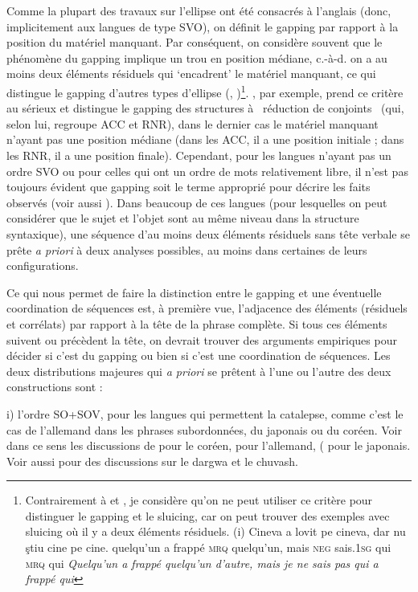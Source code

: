 Comme la plupart des travaux sur l'ellipse ont été consacrés à l'anglais (donc, implicitement aux langues de type SVO), on définit le gapping par rapport à la position du matériel manquant. Par conséquent, on considère souvent que le phénomène du gapping implique un trou en position médiane, c.-à-d. on a au moins deux éléments résiduels qui `encadrent' le matériel manquant, ce qui distingue le gapping d'autres types d'ellipse (\citet{Jackendoff1971}, \citet{Lobeck1995})\footnote{Contrairement à \citet{Jackendoff1971} et \citet{Lobeck1995}, je considère qu'on ne peut utiliser ce critère pour distinguer le gapping et le sluicing, car on peut trouver des exemples avec sluicing où il y a deux éléments résiduels.
(i)  Cineva a lovit pe cineva, dar nu ştiu cine pe cine.
  quelqu'un a frappé \textsc{mrq} quelqu'un, mais \textsc{neg} sais\textsc{.1sg} qui \textsc{mrq} qui
  \textit{Quelqu'un a frappé quelqu'un d'autre, mais je ne sais pas qui a frappé qui}}. \citet{Jackendoff1971}, par exemple, prend ce critère au sérieux et distingue le gapping des structures à {\guillemotleft}~réduction de conjoints~{\guillemotright} (qui, selon lui, regroupe ACC et RNR), dans le dernier cas le matériel manquant n'ayant pas une position médiane (dans les ACC, il a une position initiale ; dans les RNR, il a une position finale). Cependant, pour les langues n'ayant pas un ordre SVO ou pour celles qui ont un ordre de mots relativement libre, il n'est pas toujours évident que gapping soit le terme approprié pour décrire les faits observés (voir aussi \citet{Haspelmath2007}). Dans beaucoup de ces langues (pour lesquelles on peut considérer que le sujet et l'objet sont au même niveau dans la structure syntaxique), une séquence d'au moins deux éléments résiduels sans tête verbale se prête \textit{a priori} à deux analyses possibles, au moins dans certaines de leurs configurations. 

Ce qui nous permet de faire la distinction entre le gapping et une éventuelle coordination de séquences est, à première vue, l'adjacence des éléments (résiduels et corrélats) par rapport à la tête de la phrase complète. Si tous ces éléments suivent ou précèdent la tête, on devrait trouver des arguments empiriques pour décider si c'est du gapping ou bien si c'est une coordination de séquences. Les deux distributions majeures qui \textit{a priori} se prêtent à l'une ou l'autre des deux constructions sont :

i) l'ordre SO+SOV, pour les langues qui permettent la catalepse, comme c'est le cas de l'allemand dans les phrases subordonnées, du japonais ou du coréen. Voir dans ce sens les discussions de \citet{Lee2005} pour le coréen, \citet{Osborne2006} pour l'allemand, (\citet{Yosuke2009} pour le japonais. Voir aussi \citet{Kazenin2001} pour des discussions sur le dargwa et le chuvash.

